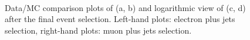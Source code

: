 \begin{figure}[htbp]
  	 \\
    \caption[Data/MC comparison plots of \MET after the final event selection]{Data/MC comparison plots of \MET (a, b)
    and logarithmic view of \MET (c, d) after the final event selection. Left-hand plots: electron plus jets selection,
    right-hand plots: muon plus jets selection.}
    \label{fig:contol_plots_METs}
\end{figure}

